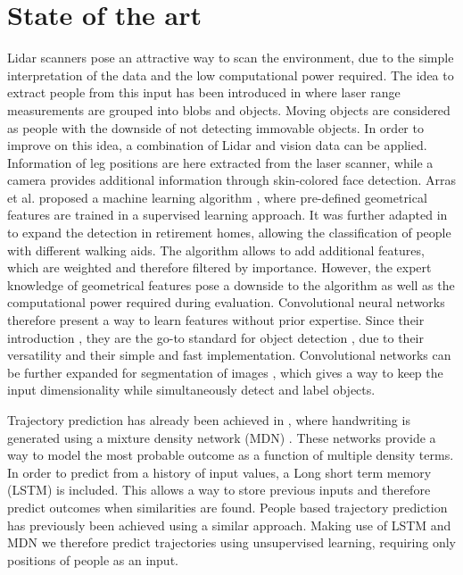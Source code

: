 \section{State of the art}

\label{sec:Stateoftheart}

Lidar scanners pose an attractive way to scan the environment, due to the simple interpretation of the data and the low computational power required.
The idea to extract people from this input has been introduced in \cite{1013691} where laser range measurements are grouped into blobs and objects. 
Moving objects are considered as people with the downside of not detecting immovable objects.
In order to improve on this idea, a combination of Lidar and vision data \cite{kleinehagenbrock2002person} can be applied. Information of leg positions are here extracted from the laser scanner, while a camera provides additional information through skin-colored face detection. 
Arras et al. proposed a machine learning algorithm \cite{Arras07usingboosted}, where pre-defined geometrical features are trained in a supervised learning approach. 
It was further adapted in \cite{weinrich2014people} to expand the detection in retirement homes, allowing the classification of people with different walking aids. 
The algorithm allows to add additional features, which are weighted and therefore filtered by importance.
However, the expert knowledge of geometrical features pose a downside to the algorithm as well as the computational power required during evaluation. Convolutional neural networks therefore present a way to learn features without prior expertise. Since their introduction \cite{lecun_gradient-based_1998}, they are the go-to standard for object detection \cite{krizhevsky_imagenet_2012}, due to their versatility and their simple and fast implementation. Convolutional networks can be further expanded for segmentation of images \cite{long2015fully}, which gives a way to keep the input dimensionality while simultaneously detect and label objects.

Trajectory prediction has already been achieved in \cite{graves2013generating}, where handwriting is generated using a mixture density network (MDN) \cite{bishop1994mixture}. These networks provide a way to model the most probable outcome as a function of multiple density terms. In order to predict from a history of input values, a Long short term memory (LSTM) \cite{hochreiter1997long} is included. This allows a way to store previous inputs and therefore predict outcomes when similarities are found. People based trajectory prediction has previously been achieved \cite{alahi2016social} using a similar approach. Making use of LSTM and MDN we therefore predict trajectories using unsupervised learning, requiring only positions of people as an input.